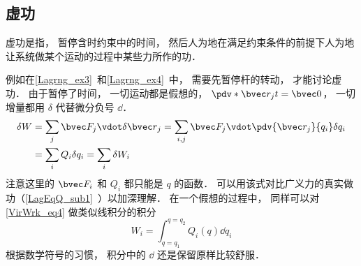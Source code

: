
\subsection{虚功}\label{VirWrk_sub1}
虚功是指， 暂停含时约束中的时间， 然后人为地在满足约束条件的前提下人为地让系统做某个运动的过程中某些力所作的功．

例如在\autoref{Lagrng_ex3}~和\autoref{Lagrng_ex4}~中， 需要先暂停杆的转动， 才能讨论虚功． 由于暂停了时间， 一切运动都是假想的， $\pdv*{\bvec r_j}{t} = \bvec 0$， 一切增量都用 $\delta$ 代替微分负号 $\dd{}$．
\begin{equation}\label{VirWrk_eq4}
\begin{aligned}
\delta{W} &= \sum_j \bvec F_j \vdot \delta{\bvec r}_j
= \sum_{i,j} \bvec F_j \vdot \pdv{\bvec r_j}{q_i}\delta q_i\\
&= \sum_i Q_i \delta q_i = \sum_i \delta{W_i}
\end{aligned}
\end{equation}
注意这里的 $\bvec F_i$ 和 $Q_i$ 都只能是 $q$ 的函数． 可以用该式对比广义力的真实做功（\autoref{LagEqQ_sub1}~）以加深理解． 在一个假想的过程中， 同样可以对\autoref{VirWrk_eq4} 做类似线积分的积分
\begin{equation}
W_i = \int_{q=q_1}^{q=q_2} Q_i(q) \dd q_i
\end{equation}
根据数学符号的习惯， 积分中的 $\dd{}$ 还是保留原样比较舒服．

